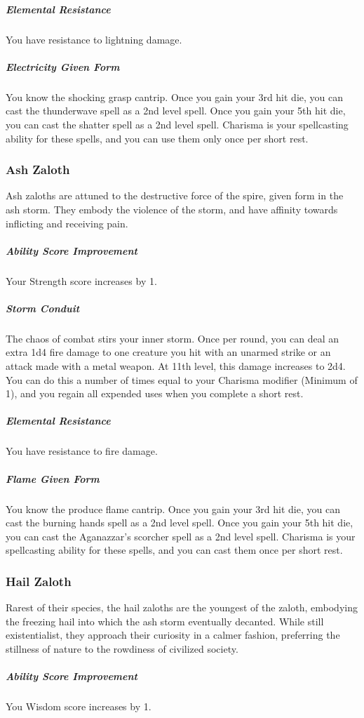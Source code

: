 \begin{linenumbers}
\subparagraph{Elemental Resistance} You have resistance to lightning damage.

\subparagraph{Electricity Given Form} You know the shocking grasp cantrip.
Once you gain your 3rd hit die, you can cast the thunderwave spell as a 2nd level spell.
Once you gain your 5th hit die, you can cast the shatter spell as a 2nd level spell.
Charisma is your spellcasting ability for these spells, and you can use them only once per short rest.

\subsubsection{Ash Zaloth}
Ash zaloths are attuned to the destructive force of the spire, given form in the ash storm.
They embody the violence of the storm, and have affinity towards inflicting and receiving pain.

\subparagraph{Ability Score Improvement} Your Strength score increases by 1.

\subparagraph{Storm Conduit} The chaos of combat stirs your inner storm.
Once per round, you can deal an extra 1d4 fire damage to one creature you hit with an unarmed strike or an attack made with a metal weapon.
At 11th level, this damage increases to 2d4.
You can do this a number of times equal to your Charisma modifier (Minimum of 1), and you regain all expended uses when you complete a short rest.

\subparagraph{Elemental Resistance} You have resistance to fire damage.

\subparagraph{Flame Given Form} You know the produce flame cantrip.
Once you gain your 3rd hit die, you can cast the burning hands spell as a 2nd level spell.
Once you gain your 5th hit die, you can cast the Aganazzar's scorcher spell as a 2nd level spell.
Charisma is your spellcasting ability for these spells, and you can cast them once per short rest.

\subsubsection{Hail Zaloth}
Rarest of their species, the hail zaloths are the youngest of the zaloth, embodying the freezing hail into which the ash storm eventually decanted.
While still existentialist, they approach their curiosity in a calmer fashion, preferring the stillness of nature to the rowdiness of civilized society.

\subparagraph{Ability Score Improvement} You Wisdom score increases by 1.


\end{linenumbers}
